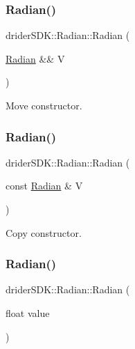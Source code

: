\subsubsection{\texorpdfstring{Radian()}{Radian()}\hspace{0.1cm}{\footnotesize\ttfamily [2/4]}}
{\footnotesize\ttfamily drider\+S\+D\+K\+::\+Radian\+::\+Radian (\begin{DoxyParamCaption}\item[{\hyperlink{classdrider_s_d_k_1_1_radian}{Radian} \&\&}]{V }\end{DoxyParamCaption})\hspace{0.3cm}{\ttfamily [default]}}

Move constructor. \mbox{\label{classdrider_s_d_k_1_1_radian_a8487633584761b8cabbe182cf26f5168}} 
\subsubsection{\texorpdfstring{Radian()}{Radian()}\hspace{0.1cm}{\footnotesize\ttfamily [3/4]}}
{\footnotesize\ttfamily drider\+S\+D\+K\+::\+Radian\+::\+Radian (\begin{DoxyParamCaption}\item[{const \hyperlink{classdrider_s_d_k_1_1_radian}{Radian} \&}]{V }\end{DoxyParamCaption})}

Copy constructor. \mbox{\label{classdrider_s_d_k_1_1_radian_a21d244cf4c918a5658b69dd1b4df2d6e}} 
\subsubsection{\texorpdfstring{Radian()}{Radian()}\hspace{0.1cm}{\footnotesize\ttfamily [4/4]}}
{\footnotesize\ttfamily drider\+S\+D\+K\+::\+Radian\+::\+Radian (\begin{DoxyParamCaption}\item[{float}]{value }\end{DoxyParamCaption})\hspace{0.3cm}{\ttfamily [explicit]}}

